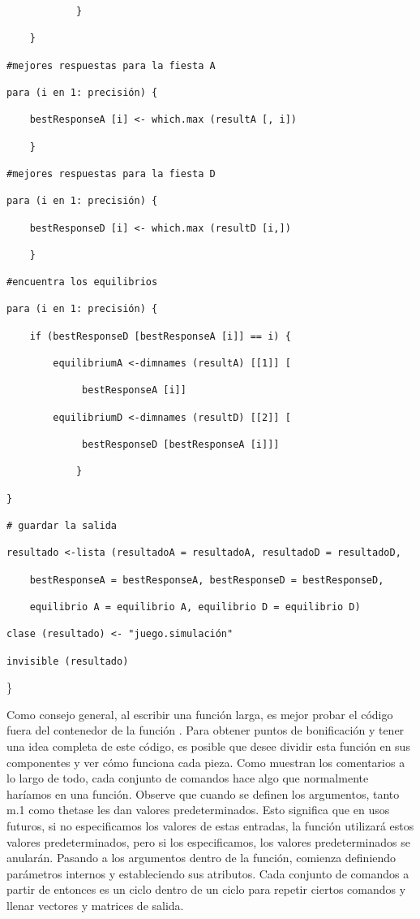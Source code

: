 \documentclass[
]{book}
\begin{document}
\begin{verbatim}
            }

    }

#mejores respuestas para la fiesta A

para (i en 1: precisión) {

    bestResponseA [i] <- which.max (resultA [, i])

    }

#mejores respuestas para la fiesta D

para (i en 1: precisión) {

    bestResponseD [i] <- which.max (resultD [i,])

    }

#encuentra los equilibrios

para (i en 1: precisión) {

    if (bestResponseD [bestResponseA [i]] == i) {

        equilibriumA <-dimnames (resultA) [[1]] [

             bestResponseA [i]]

        equilibriumD <-dimnames (resultD) [[2]] [

             bestResponseD [bestResponseA [i]]]

            }

}

# guardar la salida

resultado <-lista (resultadoA = resultadoA, resultadoD = resultadoD,

    bestResponseA = bestResponseA, bestResponseD = bestResponseD,

    equilibrio A = equilibrio A, equilibrio D = equilibrio D)

clase (resultado) <- "juego.simulación"

invisible (resultado)
\end{verbatim}

\}

Como consejo general, al escribir una función larga, es mejor probar el código fuera del contenedor de la función . Para obtener puntos de bonificación y tener una idea completa de este código, es posible que desee dividir esta función en sus componentes y ver cómo funciona cada pieza. Como muestran los comentarios a lo largo de todo, cada conjunto de comandos hace algo que normalmente haríamos en una función. Observe que cuando se definen los argumentos, tanto m.1 como thetase les dan valores predeterminados. Esto significa que en usos futuros, si no especificamos los valores de estas entradas, la función utilizará estos valores predeterminados, pero si los especificamos, los valores predeterminados se anularán. Pasando a los argumentos dentro de la función, comienza definiendo parámetros internos y estableciendo sus atributos. Cada conjunto de comandos a partir de entonces es un ciclo dentro de un ciclo para repetir ciertos comandos y llenar vectores y matrices de salida.
\end{document}
